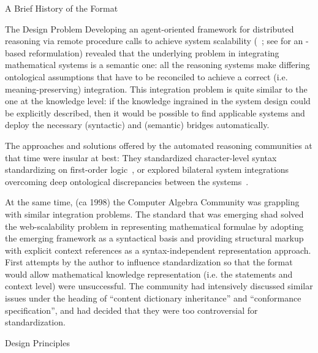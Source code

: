 \begin{omgroup}[id=omdoc-markup,short=Open Mathematical Documents]
\begin{omgroup}[id=omdoc-history]{A Brief History of the {\omdoc} Format}
\begin{omgroup}[id=situating]{The Design Problem}
      Developing an agent-oriented framework for distributed reasoning via remote
      procedure calls to achieve system scalability
      (\mathwebsb~\cite{FraKoh:mabdl99,ZimKoh:tmsbdmr02}; see {} for an
      {\omdoc}-based reformulation) revealed that the underlying problem in integrating
      mathematical systems is a semantic one: all the reasoning systems make differing
      ontological assumptions that have to be reconciled to achieve a correct
      (i.e. meaning-preserving) integration. This integration problem is quite similar to
      the one at the knowledge level: if the knowledge ingrained in the system design
      could be explicitly described, then it would be possible to find applicable systems
      and deploy the necessary (syntactic) and (semantic) bridges automatically.

      The approaches and solutions offered by the automated reasoning communities at that
      time were insular at best: They standardized character-level syntax standardizing on
      first-order logic~\cite{SuSu94,HaeKerWei:csdfgsd96}, or explored bilateral system
      integrations overcoming deep ontological discrepancies between the
      systems~\cite{FelHow:hitpnh97}.

      At the same time, (ca 1998) the Computer Algebra Community was grappling with
      similar integration problems. The {\openmath} standard that was emerging shad solved
      the web-scalability problem in representing mathematical formulae by adopting the
      emerging {\xml} framework as a syntactical basis and providing structural markup
      with explicit context references as a syntax-independent representation
      approach. First attempts by the author to influence {\openmath} standardization so
      that the format would allow mathematical knowledge representation (i.e. the
      statements and context level) were unsuccessful. The {\openmath} community had
      intensively discussed similar issues under the heading of ``content dictionary
      inheritance'' and ``conformance specification'', and had decided that they were too
      controversial for standardization.
    \end{omgroup}
    
  \begin{omgroup}{Design Principles}


\end{omgroup}
\end{omgroup}
\end{omgroup}
